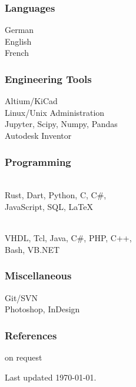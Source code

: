 \begin{facts}
    \subsubsection{Languages}
    German \\
    English \\
    French 
    \sectionsep
    
    \subsubsection{Engineering Tools}
    Altium/KiCad\\
    Linux/Unix Administration\\
    Jupyter, Scipy, Numpy, Pandas\\
    Autodesk Inventor
    \sectionsep
    
    \subsubsection{Programming}
    \\
    Rust, Dart, Python, C, C\#,\\
    JavaScript, SQL, LaTeX
    \sectionsep
    
    \\
    VHDL, Tcl, Java, C\#, PHP, C++,\\
    Bash, VB.NET
    \sectionsep
    
    \subsubsection{Miscellaneous}
    Git/SVN\\
    Photoshop, InDesign
    \sectionsep
    
    \subsubsection{References}
    on request
    
    \sectionsep
    Last updated \today.
    
    \end{facts}%

